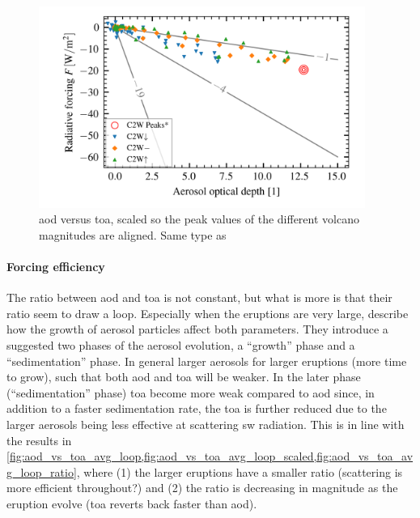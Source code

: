 \documentclass{ametsocV5}
\begin{document}
\begin{figure}
  \begin{center}
    \includegraphics[width=0.95\textwidth]{figures/aod_vs_toa_avg_scaled.png}
  \end{center}
  \caption{
    \acrshort{aod} versus \acrshort{toa}, scaled so the peak values of the different
    volcano magnitudes are aligned. Same type as \citet{gregory2016}
  }
  \label{fig:aod_vs_toa_scaled}
\end{figure}

\paragraph*{Forcing efficiency}

The ratio between \acrshort{aod} and \acrshort{toa} is not constant, but what is more is
that their ratio seem to draw a loop. Especially when the eruptions are very large,
\citet[][see their sections 3.1.2, 3.2.2]{marshall2019} describe how the growth of
aerosol particles affect both parameters. They introduce a suggested two phases of the
aerosol evolution, a ``growth'' phase and a ``sedimentation'' phase. In general larger
aerosols for larger eruptions (more time to grow), such that both \acrshort{aod} and
\acrshort{toa} will be weaker. In the later phase (``sedimentation'' phase)
\acrshort{toa} become more weak compared to \acrshort{aod} since, in addition to a
faster sedimentation rate, the \acrshort{toa} is further reduced due to the larger
aerosols being less effective at scattering \acrshort{sw} radiation. This is in line
with the results in
\cref{fig:aod_vs_toa_avg_loop,fig:aod_vs_toa_avg_loop_scaled,fig:aod_vs_toa_avg_loop_ratio},
where (1) the larger eruptions have a smaller ratio (scattering is more efficient
throughout?) and (2) the ratio is decreasing in magnitude as the eruption evolve
(\acrshort{toa} reverts back faster than \acrshort{aod}).
\end{document}
